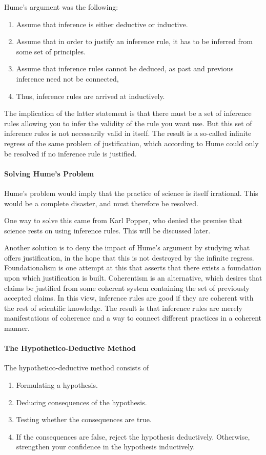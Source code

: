 Hume's argument was the following:
\begin{enumerate}
	\item Assume that inference is either deductive or inductive.
	\item Assume that in order to justify an inference rule, it has to be inferred from some set of principles.
	\item Assume that inference rules cannot be deduced, as past and previous inference need not be connected,
	\item Thus, inference rules are arrived at inductively.
\end{enumerate}
The implication of the latter statement is that there must be a set of inference rules allowing you to infer the validity of the rule you want use. But this set of inference rules is not necessarily valid in itself. The result is a so-called infinite regress of the same problem of justification, which according to Hume could only be resolved if no inference rule is justified.

\paragraph{Solving Hume's Problem}
Hume's problem would imply that the practice of science is itself irrational. This would be a complete disaster, and must therefore be resolved.

One way to solve this came from Karl Popper, who denied the premise that science rests on using inference rules. This will be discussed later.

Another solution is to deny the impact of Hume's argument by studying what offers justification, in the hope that this is not destroyed by the infinite regress. Foundationalism is one attempt at this that asserts that there exists a foundation upon which justification is built. Coherentism is an alternative, which desires that claims be justified from some coherent system containing the set of previously accepted claims. In this view, inference rules are good if they are coherent with the rest of scientific knowledge. The result is that inference rules are merely manifestations of coherence and a way to connect different practices in a coherent manner.

\paragraph{The Hypothetico-Deductive Method}
The hypothetico-deductive method consists of
\begin{enumerate}
	\item Formulating a hypothesis.
	\item Deducing consequences of the hypothesis.
	\item Testing whether the consequences are true.
	\item If the consequences are false, reject the hypothesis deductively. Otherwise, strengthen your confidence in the hypothesis inductively.
\end{enumerate}

